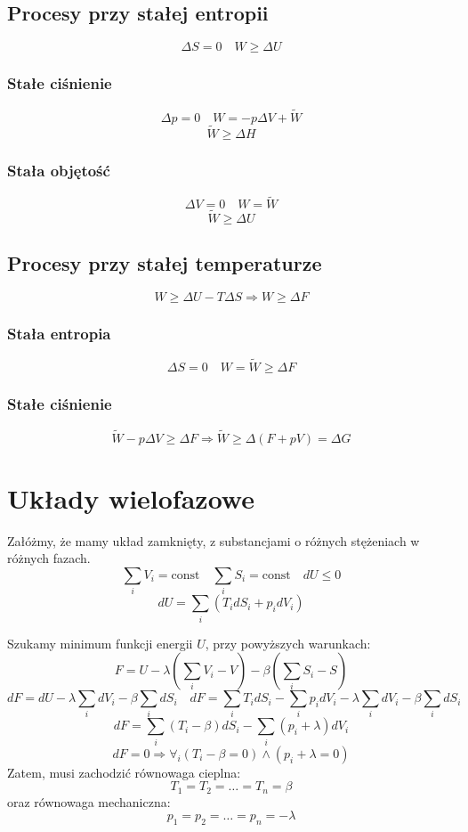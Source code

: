 \documentclass{../notatki}
\begin{document}
\subsection{Procesy przy stałej entropii}

$$
\Delta S = 0 \quad W \geq \Delta U
$$

\subsubsection{Stałe ciśnienie}

$$
\Delta p = 0 \quad W = -p \Delta V + \tilde{W}
$$
$$
\tilde{W} \geq \Delta H
$$

\subsubsection{Stała objętość}

$$
\Delta V = 0 \quad W = \tilde{W}
$$
$$
\tilde{W} \geq \Delta U
$$

\subsection{Procesy przy stałej temperaturze}

$$
W \geq \Delta U - T \Delta S \Rightarrow W \geq \Delta F
$$

\subsubsection{Stała entropia}

$$
\Delta S = 0 \quad W = \tilde{W} \geq \Delta F
$$

\subsubsection{Stałe ciśnienie}

$$
\tilde{W} - p \Delta V \geq \Delta F \Rightarrow \tilde{W} \geq
\Delta (F + pV) = \Delta G
$$

\section{Układy wielofazowe}

Załóżmy, że mamy układ zamknięty, z substancjami o różnych stężeniach
w różnych fazach.
$$
\sum_i V_i = \textrm{const} \quad \sum_i S_i = \textrm{const} \quad dU \leq 0
$$
$$
dU = \sum_i \left(T_i dS_i + p_i dV_i\right)
$$

Szukamy minimum funkcji energii $U$, przy powyższych warunkach:
$$
F = U - \lambda \left(\sum_i V_i - V\right) - \beta \left(\sum_i S_i - S\right)
$$
$$
dF = dU - \lambda \sum_i dV_i - \beta \sum_i dS_i \quad dF = \sum_i
T_i dS_i - \sum_i p_i dV_i - \lambda \sum_i dV_i - \beta \sum_i dS_i
$$
$$
dF = \sum_i \left(T_i - \beta\right) dS_i - \sum_i \left(p_i +
\lambda\right) dV_i
$$
$$
dF = 0 \Rightarrow \forall_i (T_i - \beta = 0) \land (p_i + \lambda = 0)
$$
Zatem, musi zachodzić równowaga cieplna:
$$
T_1 = T_2 = \ldots = T_n = \beta
$$
oraz równowaga mechaniczna:
$$
p_1 = p_2 = \ldots = p_n = -\lambda
$$
\end{document}
